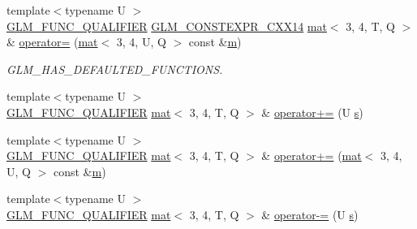 \begin{DoxyCompactItemize}
\item 
{\footnotesize template$<$typename U $>$ }\\\mbox{\hyperlink{setup_8hpp_a33fdea6f91c5f834105f7415e2a64407}{G\+L\+M\+\_\+\+F\+U\+N\+C\+\_\+\+Q\+U\+A\+L\+I\+F\+I\+ER}} \mbox{\hyperlink{setup_8hpp_a4dd12abf5e1164bc57f3a34671d03844}{G\+L\+M\+\_\+\+C\+O\+N\+S\+T\+E\+X\+P\+R\+\_\+\+C\+X\+X14}} \mbox{\hyperlink{structglm_1_1mat}{mat}}$<$ 3, 4, T, Q $>$ \& \mbox{\hyperlink{structglm_1_1mat_3_013_00_014_00_01_t_00_01_q_01_4_aac8347d8c60d7b5eac67387ca84f39f6}{operator=}} (\mbox{\hyperlink{structglm_1_1mat}{mat}}$<$ 3, 4, U, Q $>$ const \&\mbox{\hyperlink{_s_d_l__opengl__glext_8h_af593500c283bf1a787a6f947f503a5c2}{m}})
\begin{DoxyCompactList}\small\item\em G\+L\+M\+\_\+\+H\+A\+S\+\_\+\+D\+E\+F\+A\+U\+L\+T\+E\+D\+\_\+\+F\+U\+N\+C\+T\+I\+O\+NS. \end{DoxyCompactList}\item 
{\footnotesize template$<$typename U $>$ }\\\mbox{\hyperlink{setup_8hpp_a33fdea6f91c5f834105f7415e2a64407}{G\+L\+M\+\_\+\+F\+U\+N\+C\+\_\+\+Q\+U\+A\+L\+I\+F\+I\+ER}} \mbox{\hyperlink{structglm_1_1mat}{mat}}$<$ 3, 4, T, Q $>$ \& \mbox{\hyperlink{structglm_1_1mat_3_013_00_014_00_01_t_00_01_q_01_4_a8b2499990108087ab7e9bcc364ead6b1}{operator+=}} (U \mbox{\hyperlink{_s_d_l__opengl_8h_a4af680a6c683f88ed67b76f207f2e6e4}{s}})
\item 
{\footnotesize template$<$typename U $>$ }\\\mbox{\hyperlink{setup_8hpp_a33fdea6f91c5f834105f7415e2a64407}{G\+L\+M\+\_\+\+F\+U\+N\+C\+\_\+\+Q\+U\+A\+L\+I\+F\+I\+ER}} \mbox{\hyperlink{structglm_1_1mat}{mat}}$<$ 3, 4, T, Q $>$ \& \mbox{\hyperlink{structglm_1_1mat_3_013_00_014_00_01_t_00_01_q_01_4_a34254ab9a3f60274b681b3a1c0a3bf67}{operator+=}} (\mbox{\hyperlink{structglm_1_1mat}{mat}}$<$ 3, 4, U, Q $>$ const \&\mbox{\hyperlink{_s_d_l__opengl__glext_8h_af593500c283bf1a787a6f947f503a5c2}{m}})
\item 
{\footnotesize template$<$typename U $>$ }\\\mbox{\hyperlink{setup_8hpp_a33fdea6f91c5f834105f7415e2a64407}{G\+L\+M\+\_\+\+F\+U\+N\+C\+\_\+\+Q\+U\+A\+L\+I\+F\+I\+ER}} \mbox{\hyperlink{structglm_1_1mat}{mat}}$<$ 3, 4, T, Q $>$ \& \mbox{\hyperlink{structglm_1_1mat_3_013_00_014_00_01_t_00_01_q_01_4_add8deef5c20a96480b2dd587c057ab2a}{operator-\/=}} (U \mbox{\hyperlink{_s_d_l__opengl_8h_a4af680a6c683f88ed67b76f207f2e6e4}{s}})
\item 

\end{DoxyCompactItemize}
